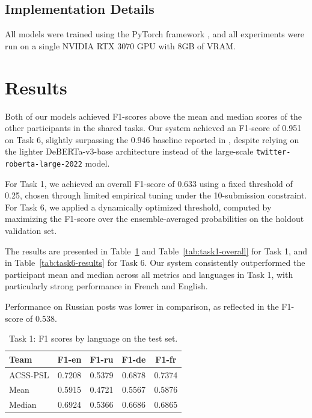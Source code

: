 \documentclass[letterpaper]{article} %
\begin{document}
\subsection{Implementation Details}

All models were trained using the PyTorch framework \cite{pytorch2019}, and all experiments were run on a single NVIDIA RTX 3070 GPU with 8GB of VRAM.

\section{Results}

Both of our models achieved F1-scores above the mean and median scores of the other participants in the shared tasks.
Our system achieved an F1-score of 0.951 on Task 6, slightly surpassing the 0.946 baseline reported in \cite{khademi2024exploring}, despite relying on the lighter DeBERTa-v3-base architecture instead of the large-scale \texttt{twitter-roberta-large-2022} model.

For Task 1, we achieved an overall F1-score of 0.633 using a fixed threshold of 0.25, chosen through limited empirical tuning under the 10-submission constraint. For Task 6, we applied a dynamically optimized threshold, computed by maximizing the F1-score over the ensemble-averaged probabilities on the holdout validation set.

The results are presented in Table~\ref{tab:task1-lang-results} and Table~\ref{tab:task1-overall} for Task 1, and in Table~\ref{tab:task6-results} for Task 6.
Our system consistently outperformed the participant mean and median across all metrics and languages in Task 1, with particularly strong performance in French and English. 

Performance on Russian posts was lower in comparison, as reflected in the F1-score of 0.538.

\begin{table}[htbp]
    \centering
    \caption{Task 1: F1 scores by language on the test set.}
    \label{tab:task1-lang-results}
    \begin{tabular}{|l|c|c|c|c|}
    \hline
    \textbf{Team} & \textbf{F1-en} & \textbf{F1-ru} & \textbf{F1-de} & \textbf{F1-fr} \\
    \hline
    ACSS-PSL & 0.7208 & 0.5379 & 0.6878 & 0.7374 \\
    Mean     & 0.5915 & 0.4721 & 0.5567 & 0.5876 \\
    Median   & 0.6924 & 0.5366 & 0.6686 & 0.6865 \\
    \hline
    \end{tabular}
\end{table}
\end{document}
